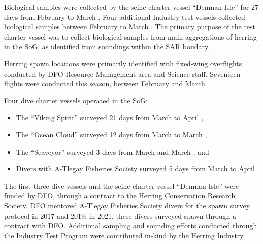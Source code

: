 Biological samples were collected by the seine charter vessel ``Denman Isle''
for 27 days from February  to March .
Four additional Industry test vessels collected biological samples
between February  to March .
The primary purpose of the test charter vessel was to
collect biological samples from main aggregations of herring in the SoG,
as identified from soundings within the SAR boudary. 

Herring spawn locations were primarily identified with fixed-wing overflights
conducted by DFO Resource Management area and Science staff.
Seventeen flights were conducted this season, between February and March.

Four dive charter vessels operated in the SoG:
\begin{itemize}
\item The ``Viking Spirit'' surveyed 21 days from March  to April ,
\item The ``Ocean Cloud'' surveyed 12 days from March  to March ,
\item The ``Seaveyor'' surveyed 3 days from March  and March , and
\item Divers with A-Tlegay Fisheries Society surveyed 5 days from March  to April .
\end{itemize}
The first three dive vessels and the seine charter vessel ``Denman Isle''
were funded by DFO, through a contract to the Herring Conservation Research Society.
DFO mentored A-Tlegay Fisheries Society divers for the spawn survey protocol in 2017 and 2019;
in 2021, these divers surveyed spawn through a contract with DFO.
Additional sampling and sounding efforts conducted through the
Industry Test Program were contributed in-kind by the Herring Industry.
